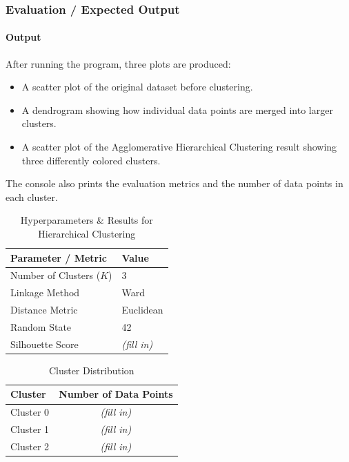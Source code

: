 \documentclass[a4paper,11pt]{article}
\begin{document}
\subsubsection{Evaluation / Expected Output}

\paragraph{Output}
After running the program, three plots are produced:
\begin{itemize}
    \item A scatter plot of the original dataset before clustering.
    \item A dendrogram showing how individual data points are merged into larger clusters.
    \item A scatter plot of the Agglomerative Hierarchical Clustering result showing three differently colored clusters.
\end{itemize}
The console also prints the evaluation metrics and the number of data points in each cluster.

\begin{table}[H]
\centering
\caption{Hyperparameters \& Results for Hierarchical Clustering}
\begin{tabular}{ll}
\toprule
\textbf{Parameter / Metric} & \textbf{Value} \\
\midrule
Number of Clusters ($K$) & 3 \\
Linkage Method           & Ward \\
Distance Metric          & Euclidean \\
Random State             & 42 \\
Silhouette Score         & \textit{(fill in)} \\
\bottomrule
\end{tabular}
\end{table}

\begin{table}[H]
\centering
\caption{Cluster Distribution}
\begin{tabular}{lc}
\toprule
\textbf{Cluster} & \textbf{Number of Data Points} \\
\midrule
Cluster 0 & \textit{(fill in)} \\
Cluster 1 & \textit{(fill in)} \\
Cluster 2 & \textit{(fill in)} \\
\bottomrule
\end{tabular}
\end{table}
\end{document}
